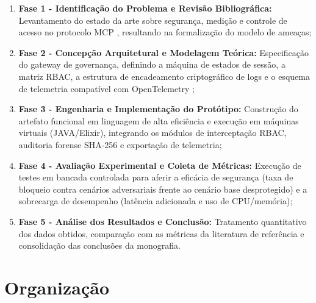 \begin{enumerate}
  \item \textbf{Fase 1 - Identificação do Problema e Revisão Bibliográfica:} Levantamento do estado da arte sobre segurança, medição e controle de acesso no protocolo MCP \cite{hasan2026mcp,guo2025measurement,hou2025mcp,jang2026hierarchical,buhler2026agentbound,singh2026mcpsecure,zhang2025acfix}, resultando na formalização do modelo de ameaças;

  \item \textbf{Fase 2 - Concepção Arquitetural e Modelagem Teórica:} Especificação do gateway de governança, definindo a máquina de estados de sessão, a matriz RBAC, a estrutura de encadeamento criptográfico de logs e o esquema de telemetria compatível com OpenTelemetry \cite{singh2026mcpsecure,jang2026hierarchical};

  \item \textbf{Fase 3 - Engenharia e Implementação do Protótipo:} Construção do artefato funcional em linguagem de alta eficiência e execução em máquinas virtuais (JAVA/Elixir), integrando os módulos de interceptação RBAC, auditoria forense SHA-256 e exportação de telemetria;

  \item \textbf{Fase 4 - Avaliação Experimental e Coleta de Métricas:} Execução de testes em bancada controlada para aferir a eficácia de segurança (taxa de bloqueio contra cenários adversariais frente ao cenário base desprotegido) e a sobrecarga de desempenho (latência adicionada e uso de CPU/memória);

  \item \textbf{Fase 5 - Análise dos Resultados e Conclusão:} Tratamento quantitativo dos dados obtidos, comparação com as métricas da literatura de referência \cite{singh2026mcpsecure,buhler2026agentbound} e consolidação das conclusões da monografia.
\end{enumerate}

\section{Organização}
\label{sec:estrutura}

